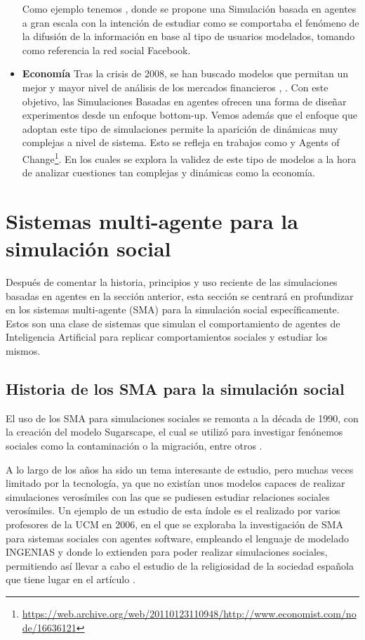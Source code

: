 \begin{itemize}
Como ejemplo tenemos \cite{nasrinpour2016agent}, donde se propone una Simulación  basada en agentes a gran escala con la intención de estudiar como se comportaba el fenómeno de la difusión de la información en base al tipo de usuarios modelados, tomando como referencia la red social Facebook.
	\item \textbf{Economía} Tras la crisis de 2008, se han buscado modelos que permitan un mejor y mayor nivel de análisis de los mercados financieros \cite {bookstaber2017end}, \cite{farmer2009economy}. Con este objetivo, las Simulaciones Basadas en agentes ofrecen una forma de diseñar experimentos desde un enfoque bottom-up. Vemos además que el enfoque que adoptan este tipo de simulaciones permite la aparición de dinámicas muy complejas a nivel de sistema. Esto se refleja en trabajos como \cite{tesfatsion2006handbook} y Agents of Change\footnote{\url{https://web.archive.org/web/20110123110948/http://www.economist.com/node/16636121}}. En los cuales se explora la validez de este tipo de modelos a la hora de analizar cuestiones tan complejas y dinámicas como la economía.
\end{itemize}

\section{Sistemas multi-agente para la simulación social}
\label{sistemasMultiagente}

Después de comentar la historia, principios y uso reciente de las simulaciones basadas en agentes en la sección anterior, esta sección se centrará en profundizar en los sistemas multi-agente (SMA) para la simulación social específicamente. Estos son una clase de sistemas que simulan el comportamiento de agentes de Inteligencia Artificial para replicar comportamientos sociales y estudiar los mismos.

\subsection{Historia de los SMA para la simulación social}
El uso de los SMA para simulaciones sociales se remonta a la década de 1990, con la creación del modelo Sugarscape, el cual se utilizó para investigar fenónemos sociales como la contaminación o la migración, entre otros \citep{axtell1996aligning}.

A lo largo de los años ha sido un tema interesante de estudio, pero muchas veces limitado por la tecnología, ya que no existían unos modelos capaces de realizar simulaciones verosímiles con las que se pudiesen estudiar relaciones sociales verosímiles. Un ejemplo de un estudio de esta índole es el realizado por varios profesores de la UCM en 2006, en el que se exploraba la investigación de SMA para sistemas sociales con agentes software, empleando el lenguaje de modelado INGENIAS y donde lo extienden para poder realizar simulaciones sociales, permitiendo así llevar a cabo el estudio de la religiosidad de la sociedad española que tiene lugar en el artículo \citep{arroyo2006simulacion}.

